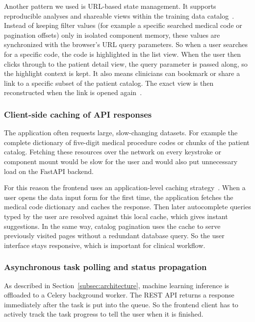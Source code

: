 Another pattern we used is URL-based state management. It supports reproducible analyses and shareable views within the training data catalog~\cite{react_url_state_2025}. Instead of keeping filter values (for example a specific searched medical code or pagination offsets) only in isolated component memory, these values are synchronized with the browser's URL query parameters. So when a user searches for a specific code, the code is highlighted in the list view. When the user then clicks through to the patient detail view, the query parameter is passed along, so the highlight context is kept. It also means clinicians can bookmark or share a link to a specific subset of the patient catalog. The exact view is then reconstructed when the link is opened again~\cite{react_url_state_2025}.

\subsubsection{Client-side caching of API responses}
The application often requests large, slow-changing datasets. For example the complete dictionary of five-digit medical procedure codes or chunks of the patient catalog. Fetching these resources over the network on every keystroke or component mount would be slow for the user and would also put unnecessary load on the FastAPI backend.

For this reason the frontend uses an application-level caching strategy~\cite{frontend_caching_2026}. When a user opens the data input form for the first time, the application fetches the medical code dictionary and caches the response. Then later autocomplete queries typed by the user are resolved against this local cache, which gives instant suggestions. In the same way, catalog pagination uses the cache to serve previously visited pages without a redundant database query. So the user interface stays responsive, which is important for clinical workflow.

\subsubsection{Asynchronous task polling and status propagation}
As described in Section~\ref{subsec:architecture}, machine learning inference is offloaded to a Celery background worker. The REST API returns a response immediately after the task is put into the queue. So the frontend client has to actively track the task progress to tell the user when it is finished.

